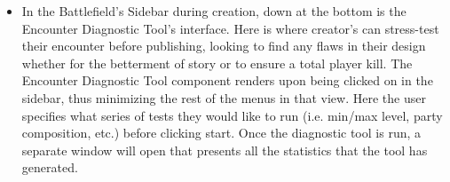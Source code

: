 \documentclass[12pt,a4paper]{report}
\begin{document}
\begin{itemize}
\begin{itemize}
				\item In the Battlefield's Sidebar during creation, down at the bottom is the Encounter Diagnostic Tool's interface. Here is where creator's can stress-test their encounter before publishing, looking to find any flaws in their design whether for the betterment of story or to ensure a total player kill. The Encounter Diagnostic Tool component renders upon being clicked on in the sidebar, thus minimizing the rest of the menus in that view. Here the user specifies what series of tests they would like to run (i.e. min/max level, party composition, etc.) before clicking start. Once the diagnostic tool is run, a separate window will open that presents all the statistics that the tool has generated.
			\end{itemize}
		\end{itemize}

	\newpage
\end{document}

